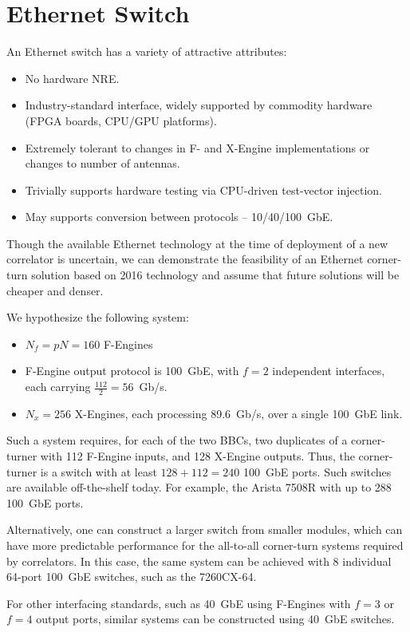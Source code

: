 \documentclass{article}
\begin{document}
\section{Ethernet Switch}
An Ethernet switch has a variety of attractive attributes:
\begin{itemize}
    \item No hardware NRE.
    \item Industry-standard interface, widely supported by commodity hardware (FPGA boards, CPU/GPU platforms).
    \item Extremely tolerant to changes in F- and X-Engine implementations or changes to number of antennas.
    \item Trivially supports hardware testing via CPU-driven test-vector injection.
    \item May supports conversion between protocols -- 10/40/100~GbE.
\end{itemize}

Though the available Ethernet technology at the time of deployment of a new correlator is uncertain, we can demonstrate the feasibility of an Ethernet corner-turn solution based on 2016 technology and assume that future solutions will be cheaper and denser.

We hypothesize the following system:
\begin{itemize}
    \item $N_f = pN = 160$ F-Engines
    \item F-Engine output protocol is 100~GbE, with $f=2$ independent interfaces, each carrying $\frac{112}{2} = 56$~Gb/s.
    \item $N_x = 256$ X-Engines, each processing 89.6~Gb/s, over a single 100~GbE link.
\end{itemize}

Such a system requires, for each of the two BBCs, two duplicates of a corner-turner with 112 F-Engine inputs, and 128 X-Engine outputs. Thus, the corner-turner is a switch with at least $128+112=240$ 100~GbE ports. Such switches are available off-the-shelf today. For example, the Arista 7508R with up to 288 100~GbE ports.

Alternatively, one can construct a larger switch from smaller modules, which can have more predictable performance for the all-to-all corner-turn systems required by correlators. In this case, the same system can be achieved with 8 individual 64-port 100~GbE switches, such as the 7260CX-64.

For other interfacing standards, such as 40~GbE using F-Engines with $f=3$ or $f=4$ output ports, similar systems can be constructed using 40~GbE switches.

{}

\end{document}

